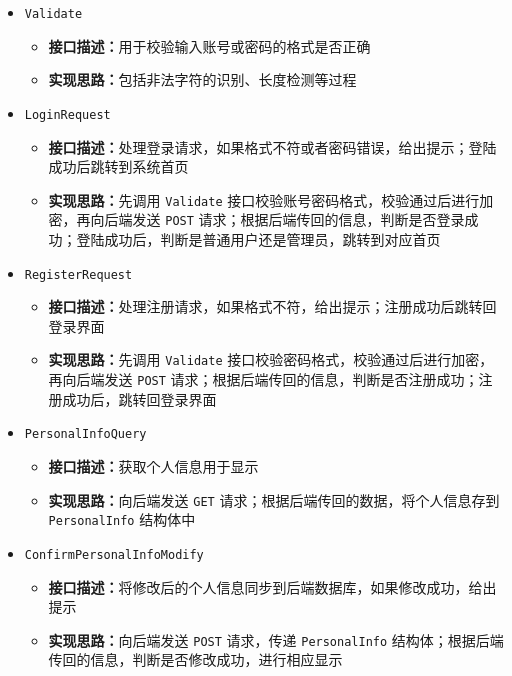 \documentclass[12pt,a4paper,UTF8]{article}
\begin{document}
\begin{itemize}

  \item \verb|Validate|
  \begin{itemize}
  \item \textbf{接口描述：}用于校验输入账号或密码的格式是否正确
  \item \textbf{实现思路：}包括非法字符的识别、长度检测等过程
  \end{itemize}

  \item \verb|LoginRequest|
  \begin{itemize}
  \item \textbf{接口描述：}处理登录请求，如果格式不符或者密码错误，给出提示；登陆成功后跳转到系统首页
  \item \textbf{实现思路：}先调用 \verb|Validate| 接口校验账号密码格式，校验通过后进行加密，再向后端发送 \verb|POST| 请求；根据后端传回的信息，判断是否登录成功；登陆成功后，判断是普通用户还是管理员，跳转到对应首页
  \end{itemize}

  \item \verb|RegisterRequest|
  \begin{itemize}
  \item \textbf{接口描述：}处理注册请求，如果格式不符，给出提示；注册成功后跳转回登录界面
  \item \textbf{实现思路：}先调用 \verb|Validate| 接口校验密码格式，校验通过后进行加密，再向后端发送 \verb|POST| 请求；根据后端传回的信息，判断是否注册成功；注册成功后，跳转回登录界面
  \end{itemize}

  \item \verb|PersonalInfoQuery|
  \begin{itemize}
  \item \textbf{接口描述：}获取个人信息用于显示
  \item \textbf{实现思路：}向后端发送 \verb|GET| 请求；根据后端传回的数据，将个人信息存到 \verb|PersonalInfo| 结构体中
  \end{itemize}

  \item \verb|ConfirmPersonalInfoModify|
  \begin{itemize}
  \item \textbf{接口描述：}将修改后的个人信息同步到后端数据库，如果修改成功，给出提示
  \item \textbf{实现思路：}向后端发送 \verb|POST| 请求，传递 \verb|PersonalInfo| 结构体；根据后端传回的信息，判断是否修改成功，进行相应显示
  \end{itemize}


\end{itemize}
\end{document}
